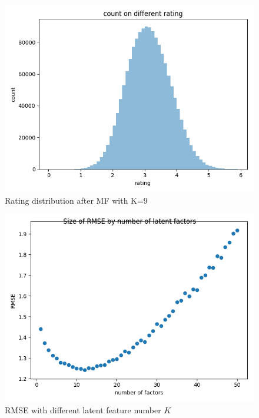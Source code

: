 \documentclass[journal, a4paper]{IEEEtran}
\begin{document}
\begin{figure}[!htb]
	\begin{center}
	\includegraphics[width=\columnwidth]{mf_cr_k9}
	\caption{Rating distribution after MF with K=9}
	\label{fig:mf_cr_k9}
	\end{center}
\end{figure}
\begin{figure}[!htb]
	\begin{center}
	\includegraphics[width=\columnwidth]{mf_rmse}
	\caption{RMSE with different latent feature number $K$}
	\label{fig:mf_rmse}
	\end{center}
\end{figure}
\end{document}

